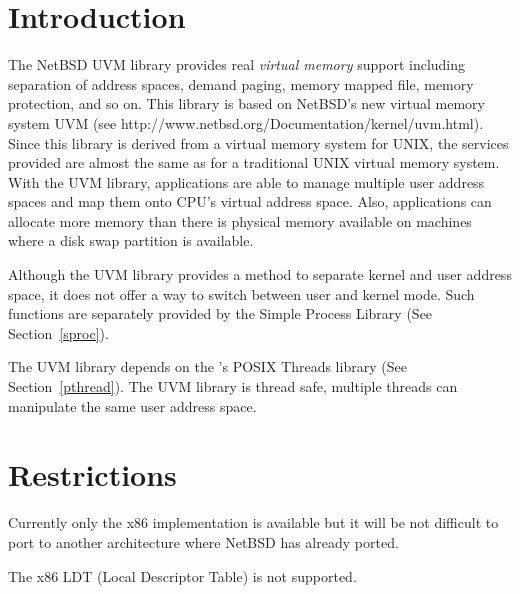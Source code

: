 %
% 
%
\label{netbsd-uvm}

\section{Introduction}

The NetBSD UVM library provides real \emph{virtual memory} support including
separation of address spaces, demand paging, memory mapped file, memory
protection, and so on.  This library is based on NetBSD's new
virtual memory system UVM (see
{http://www.netbsd.org/Documentation/kernel/uvm.html}).  Since this library
is derived from a virtual memory system for UNIX, the services provided
are almost the same as for a traditional UNIX virtual memory
system.  With the UVM library, applications are able to manage multiple user
address spaces and map them onto CPU's virtual address space.  Also,
applications can allocate more memory than there is physical memory
available on machines where a disk swap partition is available.

Although the UVM library provides a method to separate kernel and user
address space, it does not offer a way to switch between user and
kernel mode.  Such functions are separately provided by the Simple
Process Library (See Section~\ref{sproc}).

The UVM library depends on the \oskit{}'s POSIX Threads library
(See Section~\ref{pthread}).  The
UVM library is thread safe, multiple threads can manipulate the same user
address space.

\section{Restrictions}

Currently only the x86 implementation is available but it will be not
difficult to port to another architecture where NetBSD has already
ported.

The x86 LDT (Local Descriptor Table) is not supported.

